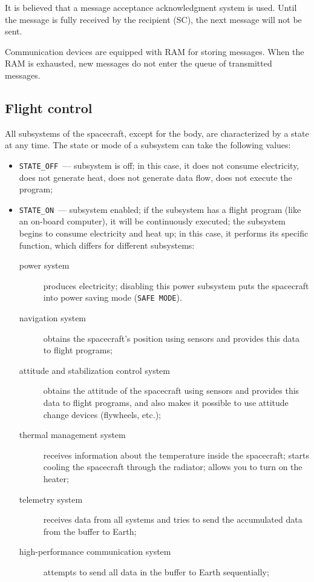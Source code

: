 \documentclass[12pt,a4paper]{article}
\begin{document}
It is believed that a message acceptance acknowledgment system is used. Until the message is fully received by the recipient (SC), the next message will not be sent.

Communication devices are equipped with RAM for storing messages. When the RAM is exhausted, new messages do not enter the queue of transmitted messages.

\subsection{Flight control}
\label{Sec:CPU}

All subsystems of the spacecraft, except for the body, are characterized by a state at any time. The state or mode of a subsystem can take the following values:

\begin{itemize}
\item \verb'STATE_OFF'~--- subsystem is off; in this case, it does not consume electricity, does not generate heat, does not generate data flow, does not execute the program;
\item \verb'STATE_ON'~--- subsystem enabled; if the subsystem has a flight program (like an on-board computer), it will be continuously executed; the subsystem begins to consume electricity and heat up; in this case, it performs its specific function, which differs for different subsystems:
    \begin{description}
   \item[power system] produces electricity; disabling this power subsystem puts the spacecraft into power saving mode (\verb'SAFE MODE').
   \item[navigation system] obtains the spacecraft's position using sensors and provides this data to flight programs;
   \item[attitude and stabilization control system] obtains the attitude of the spacecraft using sensors and provides this data to flight programs, and also makes it possible to use attitude change devices (flywheels, etc.);
   \item[thermal management system] receives information about the temperature inside the spacecraft; starts cooling the spacecraft through the radiator; allows you to turn on the heater;
   \item[telemetry system] receives data from all systems and tries to send the accumulated data from the buffer to Earth;
   \item[high-performance communication system] attempts to send all data in the buffer to Earth sequentially;

\end{description}
\end{itemize}
\end{document}
